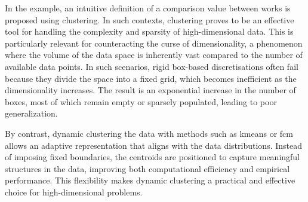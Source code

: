 
\begin{modified}
	In the example, an intuitive definition of a comparison value between works is proposed using clustering. In such contexts, clustering proves to be an effective tool for handling the complexity and sparsity of high-dimensional data. This is particularly relevant for counteracting the curse of dimensionality, a phenomenon where the volume of the data space is inherently vast compared to the number of available data points. In such scenarios, rigid box-based discretisations often fail because they divide the space into a fixed grid, which becomes inefficient as the dimensionality increases. The result is an exponential increase in the number of boxes, most of which remain empty or sparsely populated, leading to poor generalization.

	\noindent By contrast, dynamic clustering the data with methods such as \gls{kmeans} or \gls{fcm} allows an adaptive representation that aligns with the data distributions. Instead of imposing fixed boundaries, the centroids are positioned to capture meaningful structures in the data, improving both computational efficiency and empirical performance. This flexibility makes dynamic clustering a practical and effective choice for high-dimensional problems.
\end{modified}

